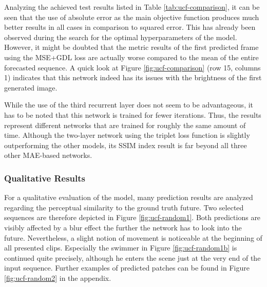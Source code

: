 Analyzing the achieved test results listed in Table \ref{tab:ucf-comparison}, it can be seen that the use of absolute error as the main objective function produces much better results in all cases in comparison to squared error. This has already been observed during the search for the optimal hyperparameters of the model. However, it might be doubted that the metric results of the first predicted frame using the MSE+GDL loss are actually worse compared to the mean of the entire forecasted sequence. A quick look at Figure \ref{fig:ucf-comparison} (row 15, columns 1) indicates that this network indeed has its issues with the brightness of the first generated image.

While the use of the third recurrent layer does not seem to be advantageous, it has to be noted that this network is trained for fewer iterations. Thus, the results represent different networks that are trained for roughly the same amount of time. Although the two-layer network using the triplet loss function is slightly outperforming the other models, its SSIM index result is far beyond all three other MAE-based networks.

\subsubsection{Qualitative Results}

For a qualitative evaluation of the model, many prediction results are analyzed regarding the perceptual similarity to the ground truth future. Two selected sequences are therefore depicted in Figure \ref{fig:ucf-random1}. Both predictions are visibly affected by a blur effect the further the network has to look into the future. Nevertheless, a slight notion of movement is noticeable at the beginning of all presented clips. Especially the swimmer in Figure \ref{fig:ucf-random1b} is continued quite precisely, although he enters the scene just at the very end of the input sequence. Further examples of predicted patches can be found in Figure \ref{fig:ucf-random2} in the appendix.

